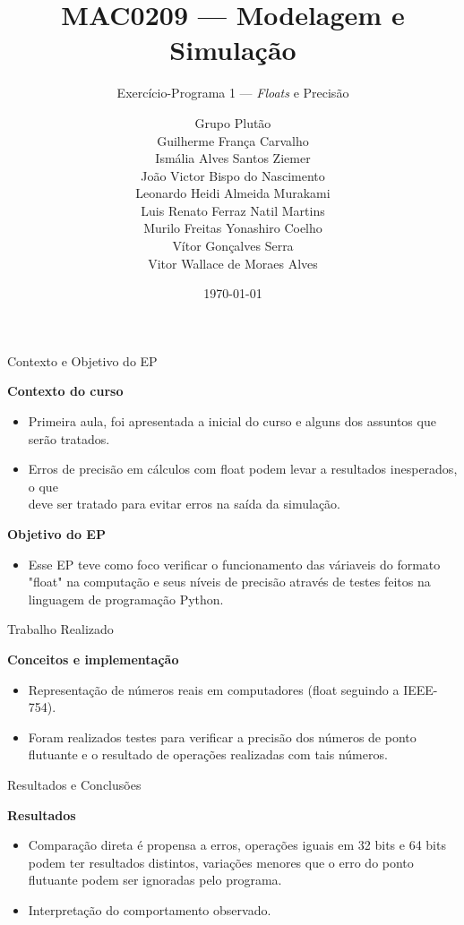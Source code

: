 \documentclass[aspectratio=169]{beamer}
\title{MAC0209 --- Modelagem e Simulação}
\subtitle{Exercício-Programa 1 --- \textit{Floats} e Precisão}
\author[Grupo Plutão]{Grupo Plutão \\[4pt]
Guilherme França Carvalho \\
Ismália Alves Santos Ziemer \\
João Victor Bispo do Nascimento \\
Leonardo Heidi Almeida Murakami \\
Luis Renato Ferraz Natil Martins \\
Murilo Freitas Yonashiro Coelho \\
Vítor Gonçalves Serra \\
Vitor Wallace de Moraes Alves }
\institute[BCC IME-USP]{Bacharelado em Ciência da Computação \\ IME -- USP}
\date{\today}
\begin{document}
\begin{frame}
\titlepage
\end{frame}

\begin{frame}{Contexto e Objetivo do EP}

\textbf{Contexto do curso}

\begin{itemize}
    \item Primeira aula, foi apresentada a inicial do curso e alguns dos assuntos que serão tratados.
    \item Erros de precisão em cálculos com float podem levar a resultados inesperados, o que \\deve ser tratado para evitar erros na saída da simulação.
\end{itemize}

\vspace{0.5cm}

\textbf{Objetivo do EP}

\begin{itemize}
    \item Esse EP teve como foco verificar o funcionamento das váriaveis do formato "float" na computação e seus níveis de precisão através de testes feitos na linguagem de programação Python.
\end{itemize}

\end{frame}

\begin{frame}{Trabalho Realizado}

\textbf{Conceitos e implementação}

\begin{itemize}
    \item Representação de números reais em computadores (float seguindo a IEEE-754).
    \item Foram realizados testes para verificar a precisão dos números de ponto flutuante e o resultado de operações realizadas com tais números.
\end{itemize}

\end{frame}

\begin{frame}{Resultados e Conclusões}

\textbf{Resultados}

\begin{itemize}
    \item Comparação direta é propensa a erros, operações iguais em 32 bits e 64 bits podem ter resultados distintos, variações menores que o erro do ponto flutuante podem ser ignoradas pelo programa.
    \item Interpretação do comportamento observado.
\end{itemize}

\end{frame}
\end{document}
